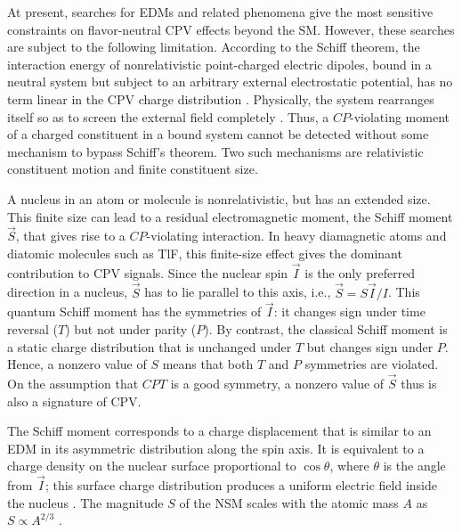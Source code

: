 At present, searches for EDMs and related phenomena give the most sensitive constraints on flavor-neutral CPV effects beyond the SM. However, these searches are subject to the following limitation. According to the Schiff theorem, the interaction energy of nonrelativistic point-charged electric dipoles, bound in a neutral system but subject to an arbitrary external electrostatic potential, has no term linear in the CPV charge distribution \cite{schiff1963measurability}. Physically, the system rearranges itself so as to screen the external field completely \cite{safronova2018search}. Thus, a $CP$-violating moment of a charged constituent in a bound system cannot be detected without some mechanism to bypass Schiff's theorem. Two such mechanisms are relativistic constituent motion and finite constituent size. 

A nucleus in an atom or molecule is nonrelativistic, but has an extended size. This finite size can lead to a residual electromagnetic moment, the Schiff moment $\vec S$, that gives rise to a $CP$-violating interaction. In heavy diamagnetic atoms and diatomic molecules such as TlF, this finite-size effect gives the dominant contribution to CPV signals. Since the nuclear spin $\vec{I}$ is the only preferred direction in a nucleus, $\vec S$ has to lie parallel to this axis, i.e., $\vec{S} = S\vec{I}/I$. This quantum Schiff moment has the symmetries of $\vec{I}$: it changes sign under time reversal ($T$) but not under parity ($P$). By contrast, the classical Schiff moment is a static charge distribution that is unchanged under $T$ but changes sign under $P$. Hence, a nonzero value of $S$ means that both $T$ and $P$ symmetries are violated.
On the assumption that $CPT$ is a good symmetry, a nonzero value of $\vec S$ thus is also a signature of CPV.

The Schiff moment corresponds to a charge displacement that is similar to an EDM in its asymmetric distribution along the spin axis. It is equivalent to a charge density on the nuclear surface proportional to $\cos{\theta}$, where $\theta$ is the angle from $\vec{I}$; this surface charge distribution produces a uniform electric field inside the nucleus \cite{GingesFlambaum2004}. The magnitude $S$ of the NSM scales with the atomic mass $A$ as $S\propto A^{2/3}$ \cite{khriplovich1997}.


